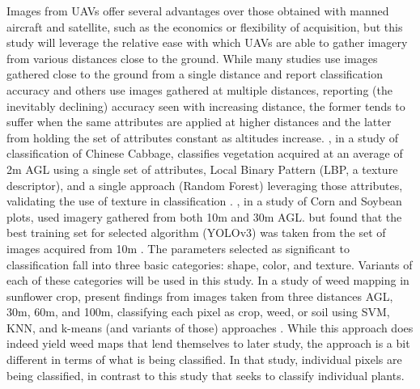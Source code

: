\documentclass[12pt]{article}
\begin{document}
 Images from UAVs offer several advantages over those obtained with manned aircraft and satellite, such as the economics or flexibility of acquisition, but this study will leverage the relative ease with which UAVs are able to gather imagery from various distances close to the ground. While many studies use images gathered close to the ground from a single distance and report classification accuracy and others use images gathered at multiple distances, reporting (the inevitably declining) accuracy seen with increasing distance, the former tends to suffer when the same attributes are applied at higher distances and the latter from holding the set of attributes constant as altitudes increase. \citeauthor{Ong2023-lm}, in a study of classification of Chinese Cabbage, classifies vegetation acquired at an average of 2m AGL using a single set of attributes, Local Binary Pattern (LBP, a texture descriptor), and a single approach (Random Forest) leveraging those attributes, validating the use of texture in classification \parencite{Ong2023-lm}. \citeauthor{Etienne2021-ik}, in a study of Corn and Soybean plots, used imagery gathered from both 10m and 30m AGL. but found that the best training set for selected algorithm (YOLOv3) was taken from the set of images acquired from 10m \parencite{Etienne2021-ik}. The parameters selected as significant to classification fall into three basic categories: shape, color, and texture. Variants of each of these categories will be used in this study. 
In a study of weed mapping in sunflower crop, \citeauthor{Perez-Ortiz2015-yk} present findings from images taken from three distances AGL, 30m, 60m, and 100m, classifying each pixel as crop, weed, or soil using SVM, KNN, and k-means (and variants of those) approaches \parencite{Perez-Ortiz2015-yk}. While this approach does indeed yield weed maps that lend themselves to later study, the approach is a bit different in terms of what is being classified. In that study, individual pixels are being classified, in contrast to this study that seeks to classify individual plants.
\end{document}
